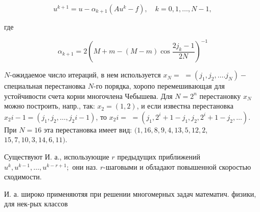 \documentclass[10pt]{article}
\begin{document}
\[

u^{k+1}=u-\alpha_{k+1}\left(A u^{k}-f\right), \quad k=0,1, \ldots, N-1,

\]



где



\[

\alpha_{k+1}=2\left(M+m-(M-m) \cos \frac{2 j_{k}-1}{2 N}\right)^{-1}

\]



$N$-ожидаемое число итераций, в нем используется $x_{N}=$ $=\left(j_{1}, j_{2}, \ldots . j_{N}\right)-$ специальная перестановка $N$-го порядка, хоропо перемешивающая для устойчивости счета корни многочлена Чебышева. Для $N=2^{n}$ перестановку $x_{N}$ можно построить, напр., так: $x_{2}=(1,2)$, и если известна перестановка $x_{2} i-1=\left(j_{1}, j_{2}, \ldots, j_{2} i-1\right)$, то $x_{2} i=$ $=\left(j_{1}, 2^{i}+1-j_{1}, j_{2}, 2^{i}+1-j_{2}, \ldots\right)$. При $N=16$ эта перестановка имеет вид: $(1,16,8,9,4,13,5,12,2$, $15,7,10,3,14,6,11)$.



Существуют И. а., использующие $r$ предыдущих приближений $u^{k}, u^{k-1}, \ldots, u^{k-r+1} ;$ они наз. $r$-шаговыми и обладают повышенной скоростью сходимости.



И. а. широко применяютяя при решении многомерных задач математич. физики, для нек-рых классов
\end{document}
